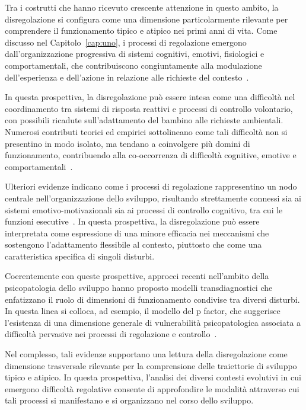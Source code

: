         Tra i costrutti che hanno ricevuto crescente attenzione in questo ambito, la disregolazione si configura come una dimensione particolarmente rilevante per comprendere il funzionamento tipico e atipico nei primi anni di vita. Come discusso nel Capitolo~\ref{cap:uno}, i processi di regolazione emergono dall'organizzazione progressiva di sistemi cognitivi, emotivi, fisiologici e comportamentali, che contribuiscono congiuntamente alla modulazione dell'esperienza e dell'azione in relazione alle richieste del contesto~\cite{calkins2007,blair2015}.

        In questa prospettiva, la disregolazione può essere intesa come una difficoltà nel coordinamento tra sistemi di risposta reattivi e processi di controllo volontario, con possibili ricadute sull'adattamento del bambino alle richieste ambientali. Numerosi contributi teorici ed empirici sottolineano come tali difficoltà non si presentino in modo isolato, ma tendano a coinvolgere più domini di funzionamento, contribuendo alla co-occorrenza di difficoltà cognitive, emotive e comportamentali~\cite{beauchaine2019,astle2022}.

        Ulteriori evidenze indicano come i processi di regolazione rappresentino un nodo centrale nell'organizzazione dello sviluppo, risultando strettamente connessi sia ai sistemi emotivo-motivazionali sia ai processi di controllo cognitivo, tra cui le funzioni esecutive~\cite{diamond2013,zelazo2020}. In questa prospettiva, la disregolazione può essere interpretata come espressione di una minore efficacia nei meccanismi che sostengono l'adattamento flessibile al contesto, piuttosto che come una caratteristica specifica di singoli disturbi.

        Coerentemente con queste prospettive, approcci recenti nell'ambito della psicopatologia dello sviluppo hanno proposto modelli transdiagnostici che enfatizzano il ruolo di dimensioni di funzionamento condivise tra diversi disturbi. In questa linea si colloca, ad esempio, il modello del p factor, che suggerisce l'esistenza di una dimensione generale di vulnerabilità psicopatologica associata a difficoltà pervasive nei processi di regolazione e controllo~\cite{caspi2014}.

        Nel complesso, tali evidenze supportano una lettura della disregolazione come dimensione trasversale rilevante per la comprensione delle traiettorie di sviluppo tipico e atipico. In questa prospettiva, l'analisi dei diversi contesti evolutivi in cui emergono difficoltà regolative consente di approfondire le modalità attraverso cui tali processi si manifestano e si organizzano nel corso dello sviluppo.

